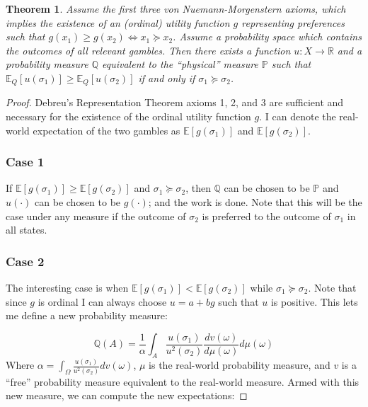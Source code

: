 \documentclass{article}
\newtheorem{theorem}{Theorem}
\begin{document}
\begin{theorem} \label{theorem1}
Assume the first three von Nuemann-Morgenstern axioms, which implies the existence of an (ordinal) utility function \(g\) representing preferences such that \(g(x_1)\geq g(x_2) \Leftrightarrow x_1 \succeq x_2 \).  Assume a probability space which contains the outcomes of all relevant gambles. Then there exists a function \(u: X \to \mathbb{R}\) and a probability measure \(\mathbb{Q}\) equivalent to the ``physical'' measure \(\mathbb{P}\) such that \(\mathbb{E}_Q\left[u(\sigma_1)\right] \geq \mathbb{E}_Q\left[u(\sigma_2)\right]\) if and only if \(\sigma_1 \succeq \sigma_2\).  
\end{theorem} 

\begin{proof}
Debreu's Representation Theorem axioms 1, 2, and 3 are sufficient and necessary for the existence of the ordinal utility function \(g\).  I can denote the real-world expectation of the two gambles as \(\mathbb{E}[g(\sigma_1)]\) and \(\mathbb{E}[g(\sigma_2)]\). 

\subsubsection*{Case 1}

If \(\mathbb{E}[g(\sigma_1)]\geq\mathbb{E}[g(\sigma_2)]\) and \(\sigma_1 \succeq \sigma_2\), then \(\mathbb{Q}\) can be chosen to be \(\mathbb{P}\) and \(u(\cdot)\) can be chosen to be \(g(\cdot)\); and the work is done. Note that this will be the case under any measure if the outcome of \(\sigma_2\) is preferred to the outcome of \(\sigma_1\) in all states.

\subsubsection*{Case 2}

The interesting case is when \(\mathbb{E}[g(\sigma_1)]<\mathbb{E}[g(\sigma_2)]\) while \(\sigma_1 \succeq \sigma_2\).  Note that since \(g\) is ordinal I can always choose \(u=a+bg\) such that \(u\) is positive.  This lets me define a new probability measure:

\[\mathbb{Q}(A)=\frac{1}{\alpha}\int_A \frac{u(\sigma_1)}{u^2(\sigma_2)} \frac{dv(\omega) }{ d\mu(\omega)} d\mu(\omega)\] 
Where \(\alpha=\int_\Omega \frac{u(\sigma_1)}{u^2(\sigma_2)} dv(\omega) \), \(\mu\) is the real-world probability measure, and \(v\) is a ``free'' probability measure equivalent to the real-world measure.  Armed with this new measure, we can compute the new expectations:


\end{proof}
\end{document}
